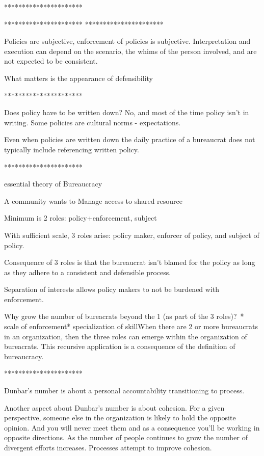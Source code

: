 **********************

**********************
**********************

Policies are subjective, enforcement of policies is subjective. Interpretation and execution can depend on the scenario, the whims of the person involved, and are not expected to be consistent.

What matters is the appearance of defensibility

**********************

Does policy have to be written down? 
No, and most of the time policy isn't in writing. Some policies are cultural norms - expectations. 

Even when policies are written down the daily practice of a bureaucrat does not typically include referencing written policy.

**********************

essential theory of Bureaucracy

A community wants to Manage access to shared resource

Minimum is 2 roles: policy+enforcement, subject

With sufficient scale, 3 roles arise: policy maker, enforcer of policy, and subject of policy.

Consequence of 3 roles is that the bureaucrat isn't blamed for the policy as long as they adhere to a consistent and defensible process. 

Separation of interests allows policy makers to not be burdened with enforcement.

Why grow the number of bureacrats beyond the 1 (as part of the 3 roles)? * scale of enforcement* specialization of skillWhen there are 2 or more bureaucrats in an organization, then the three roles can emerge within the organization of bureacrats. This recursive application is a consequence of the definition of bureaucracy.

**********************

Dunbar's number is about a personal accountability transitioning to process.

Another aspect about Dunbar's number is about cohesion. For a given perspective, someone else in the organization is likely to hold the opposite opinion. And you will never meet them and as a consequence you'll be working in opposite directions. As the number of people continues to grow the number of divergent efforts increases. Processes attempt to improve cohesion.

